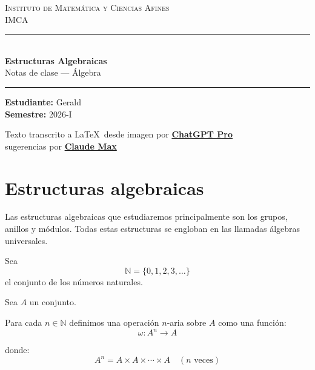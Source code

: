 \documentclass[12pt]{article}
\begin{document}
\begin{titlepage}
  \centering
  \vspace*{3cm}

  {\Large\scshape Instituto de Matemática y Ciencias Afines}\\[0.4cm]
  {\large\scshape IMCA}\\[0.3cm]
  \noindent\rule{\textwidth}{0.4pt}\\[0.6cm]

  {\Huge\bfseries Estructuras Algebraicas}\\[0.4cm]
  {\large Notas de clase --- Álgebra}\\[0.2cm]
  \noindent\rule{\textwidth}{0.4pt}

  \vfill

  \begin{flushleft}
    \large
    \textbf{Estudiante:} Gerald\\[0.3cm]
    \textbf{Semestre:} 2026-I\\[0.3cm]
  \end{flushleft}

  \vfill

  \begin{center}
    \normalsize\color{gray}
    Texto transcrito a \LaTeX\ desde imagen por
    \href{https://chatgpt.com/es-419/pricing/}{\textbf{ChatGPT Pro}}\\[0.2cm]
    sugerencias por
    \href{https://claude.com/pricing}{\textbf{Claude Max}}
  \end{center}
  \vspace{1cm}
\end{titlepage}

\section*{Estructuras algebraicas}

Las estructuras algebraicas que estudiaremos principalmente son los grupos, anillos y módulos.
Todas estas estructuras se engloban en las llamadas álgebras universales.

Sea
\[
\mathbb{N}=\{0,1,2,3,\dots\}
\]
el conjunto de los números naturales.

Sea $A$ un conjunto.

Para cada $n\in\mathbb{N}$ definimos una operación $n$-aria sobre $A$ como una función:
\[
\omega:A^n\to A
\]

donde:
\[
A^n=A\times A\times \cdots \times A \quad (n \text{ veces})
\]
\end{document}
